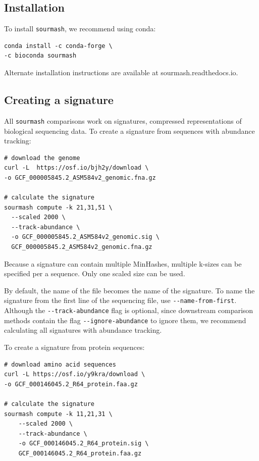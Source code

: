 \documentclass[10pt,a4paper,twocolumn]{article}
\begin{document}
\subsection*{Installation}

To install \lstinline{sourmash}, we recommend using conda:

\begin{lstlisting}
conda install -c conda-forge \
-c bioconda sourmash
\end{lstlisting}

Alternate installation instructions are available at sourmash.readthedocs.io. 

\subsection*{Creating a signature}

All \lstinline{sourmash} comparisons work on signatures, compressed representations of biological sequencing data. To create a signature from sequences with abundance tracking:

\begin{lstlisting}
# download the genome
curl -L  https://osf.io/bjh2y/download \
-o GCF_000005845.2_ASM584v2_genomic.fna.gz

# calculate the signature
sourmash compute -k 21,31,51 \ 
  --scaled 2000 \ 
  --track-abundance \ 
  -o GCF_000005845.2_ASM584v2_genomic.sig \
  GCF_000005845.2_ASM584v2_genomic.fna.gz
\end{lstlisting}

Because a signature can contain multiple MinHashes, multiple k-sizes can be specified per a sequence. Only one scaled size can be used. 

By default, the name of the file becomes the name of the signature. To name the signature from the first line of the sequencing file, use \lstinline{--name-from-first}. Although the \lstinline{--track-abundance} flag is optional, since downstream comparison methods contain the flag \lstinline{--ignore-abundance} to ignore them, we recommend calculating all signatures with abundance tracking. 

\smallskip

To create a signature from protein sequences:

\begin{lstlisting}
# download amino acid sequences
curl -L https://osf.io/y9kra/download \ 
-o GCF_000146045.2_R64_protein.faa.gz

# calculate the signature
sourmash compute -k 11,21,31 \
    --scaled 2000 \
    --track-abundance \
    -o GCF_000146045.2_R64_protein.sig \ 
    GCF_000146045.2_R64_protein.faa.gz
\end{lstlisting}
\end{document}
